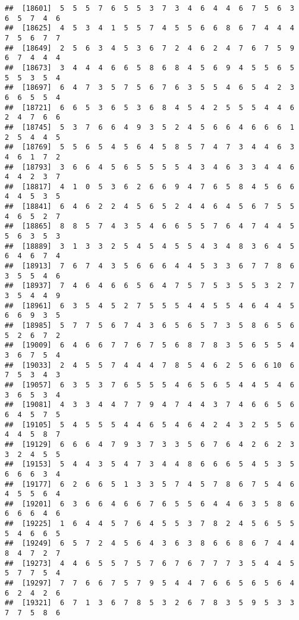 \documentclass[
]{book}
\begin{document}
\begin{verbatim}
##  [18601]  5  5  5  7  6  5  5  3  7  3  4  6  4  4  6  7  5  6  3  6  5  7  4  6
##  [18625]  4  5  3  4  1  5  5  7  4  5  5  6  6  8  6  7  4  4  4  7  5  6  7  7
##  [18649]  2  5  6  3  4  5  3  6  7  2  4  6  2  4  7  6  7  5  9  6  7  4  4  4
##  [18673]  3  4  4  4  6  6  5  8  6  8  4  5  6  9  4  5  5  6  5  5  5  3  5  4
##  [18697]  6  4  7  3  5  7  5  6  7  6  3  5  5  4  6  5  4  2  3  6  6  5  5  4
##  [18721]  6  6  5  3  6  5  3  6  8  4  5  4  2  5  5  5  4  4  6  2  4  7  6  6
##  [18745]  5  3  7  6  6  4  9  3  5  2  4  5  6  6  4  6  6  6  1  2  5  4  4  5
##  [18769]  5  5  6  5  4  5  6  4  5  8  5  7  4  7  3  4  4  6  3  4  6  1  7  2
##  [18793]  3  6  6  4  5  6  5  5  5  5  4  3  4  6  3  3  4  4  6  4  4  2  3  7
##  [18817]  4  1  0  5  3  6  2  6  6  9  4  7  6  5  8  4  5  6  6  4  4  5  3  5
##  [18841]  6  4  6  2  2  4  5  6  5  2  4  4  6  4  5  6  7  5  5  4  6  5  2  7
##  [18865]  8  8  5  7  4  3  5  4  6  6  5  5  7  6  4  7  4  4  5  5  6  3  5  3
##  [18889]  3  1  3  3  2  5  4  5  4  5  5  4  3  4  8  3  6  4  5  6  4  6  7  4
##  [18913]  7  6  7  4  3  5  6  6  6  4  4  5  3  3  6  7  7  8  6  3  5  5  4  6
##  [18937]  7  4  6  4  6  6  5  6  4  7  5  7  5  3  5  5  3  2  7  3  5  4  4  9
##  [18961]  6  3  5  4  5  2  7  5  5  5  4  4  5  5  4  6  4  4  5  6  6  9  3  5
##  [18985]  5  7  7  5  6  7  4  3  6  5  6  5  7  3  5  8  6  5  6  5  2  6  7  2
##  [19009]  6  4  6  6  7  7  6  7  5  6  8  7  8  3  5  6  5  5  4  3  6  7  5  4
##  [19033]  2  4  5  5  7  4  4  4  7  8  5  4  6  2  5  6  6 10  6  7  5  3  4  3
##  [19057]  6  3  5  3  7  6  5  5  5  4  6  5  6  5  4  4  5  4  6  3  6  5  3  4
##  [19081]  4  3  3  4  4  7  7  9  4  7  4  4  3  7  4  6  6  5  6  6  4  5  7  5
##  [19105]  5  4  5  5  5  4  4  6  5  4  6  4  2  4  3  2  5  5  6  4  4  5  8  7
##  [19129]  6  6  6  4  7  9  3  7  3  3  5  6  7  6  4  2  6  2  3  3  2  4  5  5
##  [19153]  5  4  4  3  5  4  7  3  4  4  8  6  6  6  5  4  5  3  5  6  6  6  3  4
##  [19177]  6  2  6  6  5  1  3  3  5  7  4  5  7  8  6  7  5  4  6  4  5  5  6  4
##  [19201]  6  3  6  6  4  6  6  7  6  5  5  6  4  4  6  3  5  8  6  6  6  6  4  6
##  [19225]  1  6  4  4  5  7  6  4  5  5  3  7  8  2  4  5  6  5  5  5  4  6  6  5
##  [19249]  6  5  7  2  4  5  6  4  3  6  3  8  6  6  8  6  7  4  4  8  4  7  2  7
##  [19273]  4  4  6  5  5  7  5  7  6  7  6  7  7  7  3  5  4  4  5  5  7  7  5  4
##  [19297]  7  7  6  6  7  5  7  9  5  4  4  7  6  6  5  6  5  6  4  6  2  4  2  6
##  [19321]  6  7  1  3  6  7  8  5  3  2  6  7  8  3  5  9  5  3  3  7  7  5  8  6

\end{verbatim}
\end{document}
